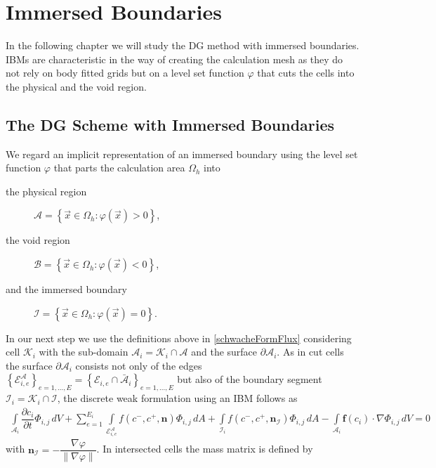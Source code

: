 \chapter{Immersed Boundaries}
In the following chapter we will study the DG method with immersed boundaries. IBMs are characteristic in the way of creating the calculation mesh as they do not rely on body fitted grids but on a level set function $\varphi$ that cuts the cells into the physical and the void region. 
	\section{The DG Scheme with Immersed Boundaries}
	We regard an implicit representation of an immersed boundary using the level set function $\varphi$ that parts the calculation area $\Omega_h$ into 
	\begin{description}
		\item[the physical region] $\mathcal{A} = \left\{\vec{x} \in \Omega_h : \varphi (\vec{x}) > 0 \right\}$,
		\item[the void region] $\mathcal{B} = \left\{ \vec{x}\in \Omega_h : \varphi (\vec{x}) < 0 \right\}$, 
		\item[and the immersed boundary] $\mathcal{I} = \left\{ \vec{x}\in \Omega_h : \varphi (\vec{x}) = 0 \right\}$.
	\end{description}
	In our next step we use the definitions above in \ref{schwacheFormFlux} considering cell $\mathcal{K}_i$ with the sub-domain $\mathcal{A}_i = \mathcal{K}_i \cap \mathcal{A}$ and the surface $\partial \mathcal{A}_i$. As in cut cells the surface $\partial \mathcal{A}_i$ consists not only of the edges $\left\{\mathcal{E}_{i,e}^\mathcal{A} \right\}_{e = 1, ..., E} = \left\{\mathcal{E}_{i,e} \cap \bar{\mathcal{A}}_i \right\}_{e = 1, ..., E}$ but also of the boundary segment $\mathcal{I}_i = \mathcal{K}_i \cap \mathcal{I}$, the discrete weak formulation using an IBM follows as
	\begin{align}
	\int\limits_{\mathcal{A}_i} \dfrac{\partial c_i}{\partial t}\Phi_{i,j} \, dV +
	\sum_{e=1}^{E_i}\int\limits_{\mathcal{E}_{i,e}^\mathcal{A}} f \left( c^-, c^+, \mathbf{n} \right) \Phi_{i,j} \, dA + \int\limits_{\mathcal{I}_{i}} f \left( c^-, c^+, \mathbf{n}_\mathcal{I} \right) \Phi_{i,j} \, dA - \int\limits_{\mathcal{A}_i} \boldsymbol{f}\left(c_i\right) \cdot \nabla\Phi_{i,j} \, dV = 0
	\label{schwacheFormIBM}
	\end{align}
	with $\mathbf{n}_\mathcal{I} = - \dfrac{\nabla\varphi}{\| \nabla\varphi \|}$.
	In intersected cells the mass matrix is defined by
